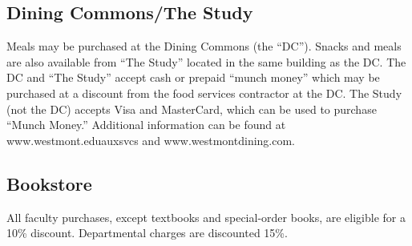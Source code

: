 	\subsection{ Dining Commons/The Study}
		Meals may be purchased at the Dining Commons (the ``DC'').  Snacks and meals are also available from ``The Study'' located in the same building as the DC.  The DC and ``The Study'' accept cash or prepaid ``munch money'' which may be purchased at a discount from the food services contractor at the DC.  The Study (not the DC) accepts Visa and MasterCard, which can be used to purchase ``Munch Money.''  Additional information can be found at www.westmont.eduauxsvcs and www.westmontdining.com.
	\subsection{ Bookstore}
		All faculty purchases, except textbooks and special-order books, are eligible
		for a 10\% discount.  Departmental charges are discounted 15\%.
